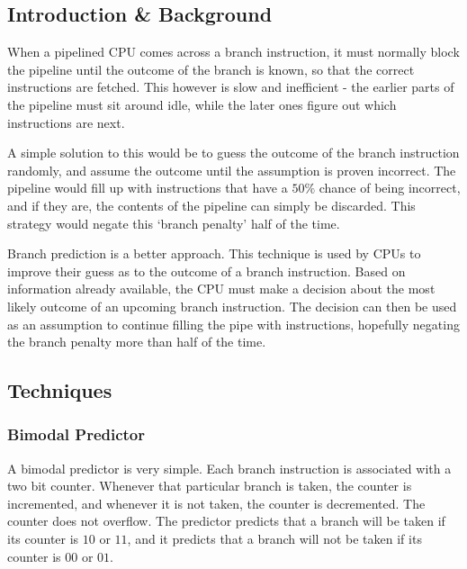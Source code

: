 
\subsection{Introduction \& Background}

When a pipelined CPU comes across a branch instruction, it must normally
block the pipeline until the outcome of the branch is known, so that the
correct instructions are fetched. This however is slow and inefficient -
the earlier parts of the pipeline must sit around idle, while the later
ones figure out which instructions are next.

A simple solution to this would be to guess the outcome of the branch
instruction randomly, and assume the outcome until the assumption is
proven incorrect.
The pipeline would fill up with instructions that have a \(50\%\) chance
of being incorrect, and if they are, the contents of the pipeline
can simply be discarded.
This strategy would negate this `branch penalty' half of the time.

Branch prediction is a better approach.
This technique is used by CPUs to improve their guess as to the outcome of
a branch instruction.
Based on information already available, the CPU must make a decision about
the most likely outcome of an upcoming branch instruction. The decision can
then be used as an assumption to continue filling the pipe with instructions,
hopefully negating the branch penalty more than half of the time.

\subsection{Techniques}

\subsubsection{Bimodal Predictor}

A bimodal predictor is very simple.
Each branch instruction is associated with a two bit counter.
Whenever that particular branch is taken, the counter is incremented,
and whenever it is not taken, the counter is decremented.
The counter does not overflow.
The predictor predicts that a branch will be taken if its counter
is \(10\) or \(11\), and it predicts that a branch will not be taken
if its counter is \(00\) or \(01\).~\cite{Mcfarling1993}

